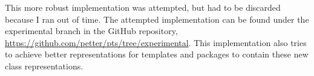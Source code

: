 This more robust implementation was attempted, but had to be discarded because I ran out of time.
The attempted implementation can be found under the experimental branch in the GitHub repository, \url{https://github.com/petter/pts/tree/experimental}.
This implementation also tries to achieve better representations for templates and packages to contain these new class representations.
